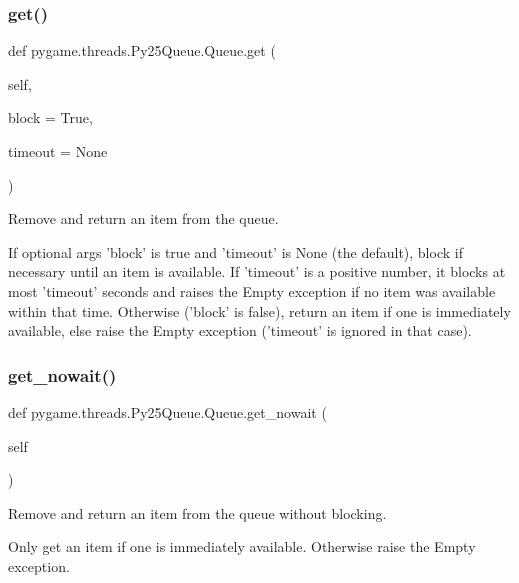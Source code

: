 \subsubsection{\texorpdfstring{get()}{get()}}
{\footnotesize\ttfamily def pygame.\+threads.\+Py25\+Queue.\+Queue.\+get (\begin{DoxyParamCaption}\item[{}]{self,  }\item[{}]{block = {\ttfamily True},  }\item[{}]{timeout = {\ttfamily None} }\end{DoxyParamCaption})}

\begin{DoxyVerb}Remove and return an item from the queue.

If optional args 'block' is true and 'timeout' is None (the default),
block if necessary until an item is available. If 'timeout' is
a positive number, it blocks at most 'timeout' seconds and raises
the Empty exception if no item was available within that time.
Otherwise ('block' is false), return an item if one is immediately
available, else raise the Empty exception ('timeout' is ignored
in that case).
\end{DoxyVerb}
 \mbox{\label{classpygame_1_1threads_1_1_py25_queue_1_1_queue_a2f78bfd6cdb4a12d8eb82418bc4d29f7}} 
\subsubsection{\texorpdfstring{get\+\_\+nowait()}{get\_nowait()}}
{\footnotesize\ttfamily def pygame.\+threads.\+Py25\+Queue.\+Queue.\+get\+\_\+nowait (\begin{DoxyParamCaption}\item[{}]{self }\end{DoxyParamCaption})}

\begin{DoxyVerb}Remove and return an item from the queue without blocking.

Only get an item if one is immediately available. Otherwise
raise the Empty exception.
\end{DoxyVerb}
 \mbox{\label{classpygame_1_1threads_1_1_py25_queue_1_1_queue_a684afbc471faf948431e81f522fe3288}} 
